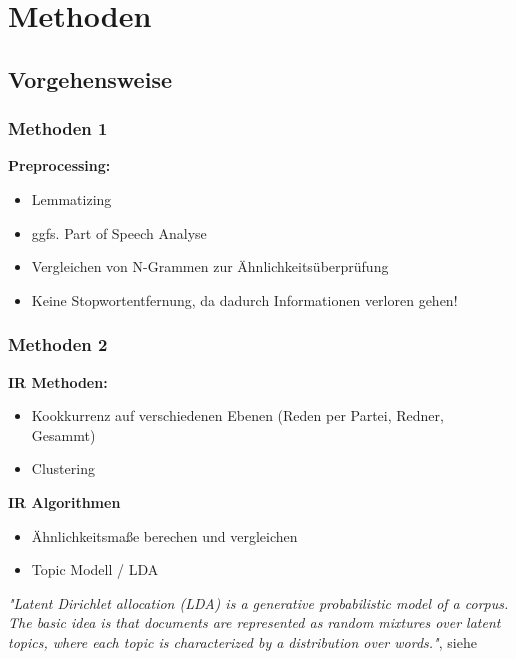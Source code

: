 \documentclass[11pt, a4paper]{beamer}
\begin{document}
\section{Methoden}
\subsection{Vorgehensweise}
\begin{frame}
\frametitle{Methoden 1}
\textbf{Preprocessing:}
\begin{itemize}
\item Lemmatizing
\item ggfs. Part of Speech Analyse  
\item Vergleichen von N-Grammen zur Ähnlichkeitsüberprüfung
\item Keine Stopwortentfernung, da dadurch Informationen verloren gehen!
\end{itemize}
\end{frame}

\begin{frame}
\frametitle{Methoden 2}
\textbf{IR Methoden:}
\begin{itemize}
\item Kookkurrenz auf verschiedenen Ebenen (Reden per Partei, Redner, Gesammt)
\item Clustering
\end{itemize}
\textbf{IR Algorithmen}
\begin{itemize}
\item Ähnlichkeitsmaße berechen und vergleichen 
\item Topic Modell / LDA 
\end{itemize}
\textit {"Latent Dirichlet allocation (LDA) is a generative probabilistic
	model of a corpus. The basic idea is that documents are represented as
 	random mixtures over latent topics, where each topic is characterized by a
 	distribution over words."}, siehe \cite{blatent}
%  	
\end{frame} 
\end{document}
